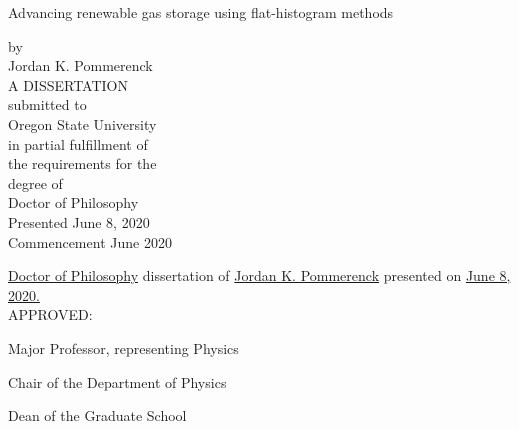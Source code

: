 \newpage{}
\thispagestyle{empty}
\singlespacing

\begin{center}
Advancing renewable gas storage using flat-histogram methods

\vspace{1.0cm}
by \\
Jordan K. Pommerenck \\
\vspace{3.0cm}
A DISSERTATION \\
\vspace{0.5cm}
submitted to \\
\vspace{0.5cm}
Oregon State University \\
\vspace{3.0cm}
in partial fulfillment of \\
the requirements for the \\
degree of \\
\vspace{1.0cm}
Doctor of Philosophy \\
\vspace{3.0cm}
Presented June 8, 2020  \\
Commencement June 2020
\end{center}

\newpage{}
\thispagestyle{empty}
\singlespacing
\justify{}
\underline{Doctor of Philosophy} dissertation of \underline{Jordan K. Pommerenck} presented on
\underline{June 8, 2020.} \\

\justify{}
\vspace{0.5cm}
APPROVED: \\

\justify{}
\underline{\hspace{15cm}}
\begin{flushleft}
Major Professor, representing Physics
\vspace{1.0cm}
\end{flushleft}

\justify{}
\underline{\hspace{15cm}}
\begin{flushleft}
Chair of the Department of Physics
\vspace{1.0cm}
\end{flushleft}

\justify{}
\underline{\hspace{15cm}}
\begin{flushleft}
Dean of the Graduate School
\vspace{1.0cm}
\end{flushleft}

